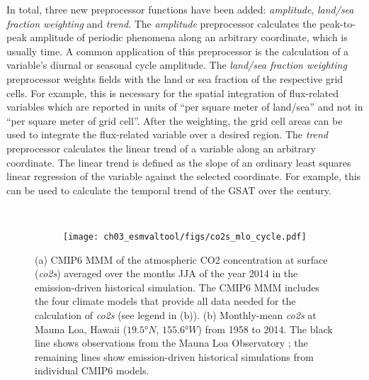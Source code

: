 In total, three new preprocessor functions have been added: \emph{amplitude},
\emph{land/sea fraction weighting} and \emph{trend}. The \emph{amplitude}
preprocessor calculates the peak-to-peak amplitude of periodic phenomena along
an arbitrary coordinate, which is usually time. A common application of this
preprocessor is the calculation of a variable's diurnal or seasonal cycle
amplitude. The \emph{land/sea fraction weighting} preprocessor weights fields
with the land or sea fraction of the respective grid cells. For example, this
is necessary for the spatial integration of flux-related variables which are
reported in units of \enquote{per square meter of land/sea} and not in
\enquote{per square meter of grid cell}. After the weighting, the grid cell
areas can be used to integrate the flux-related variable over a desired region.
The \emph{trend} preprocessor calculates the linear trend of a variable along
an arbitrary coordinate. The linear trend is defined as the slope of an
ordinary least squares linear regression of the variable against the selected
coordinate. For example, this can be used to calculate the temporal trend of
the \ac{GSAT} over the  century.

\begin{figure}[t]
  \centering
  \begin{subfigure}[b]{\SubfigureWidth{}}
    \caption{}
    \label{fig:03:co2s:a}
  \end{subfigure}
  ~
  \begin{subfigure}[b]{\SubfigureWidth{}}
    \texttt{[image: 
      ch03\_esmvaltool/figs/co2s\_mlo\_cycle.pdf]}
    \caption{}
    \label{fig:03:co2s:b}
  \end{subfigure}
  \caption{(a) \acs{CMIP}6 \acf{MMM} of the atmospheric \acs{CO2} concentration
    at surface (\emph{co2s}) averaged over the months \acf{JJA} of the year
    2014 in the emission-driven historical simulation. The \acs{CMIP}6
    \acs{MMM} includes the four climate models that provide all data needed
    for the calculation of \emph{co2s} (see legend in (b)). (b) Monthly-mean
    \emph{co2s} at Mauna Loa, Hawaii ($19.5 \unit{\degree N}$, $155.6
    \unit{\degree W}$) from 1958 to 2014. The black line shows observations
    from the Mauna Loa Observatory \autocite{Keeling2005}; the remaining lines
    show emission-driven historical simulations from individual \acs{CMIP}6
    models.}
  \label{fig:03:co2s}
\end{figure}

